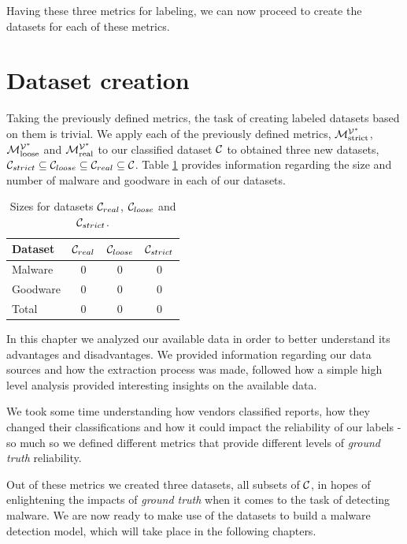 Having these three metrics for labeling, we can now proceed to create the datasets for each of these metrics.

\section{Dataset creation}
\label{section:dataset_creation}

Taking the previously defined metrics, the task of creating labeled datasets based on them is trivial.
We apply each of the previously defined metrics, $\mathcal{M}_{\mathrm{strict}}^{\mathcal{V}^*}$, $\mathcal{M}_{\mathrm{loose}}^{\mathcal{V}^*}$ and $\mathcal{M}_{\mathrm{real}}^{\mathcal{V}^*}$ to our classified dataset $\mathcal{C}$ to obtained three new datasets, $\mathcal{C}_{strict}\subseteq\mathcal{C}_{loose}\subseteq\mathcal{C}_{real}\subseteq\mathcal{C}$.
Table \ref{tab:dataset_sizes} provides information regarding the size and number of malware and goodware in each of our datasets.

\begin{table}[!htb]
	\renewcommand{\arraystretch}{1.2} %
	\centering
	\begin{tabular}{lccc}
		\toprule
		Dataset			& $\mathcal{C}_{real}$ & $\mathcal{C}_{loose}$ & $\mathcal{C}_{strict}$	\\
		\midrule
		Malware			& 0 & 0 & 0\\
		Goodware		& 0 & 0 & 0\\
		\midrule
		Total			& 0 & 0 & 0\\
		\bottomrule
	\end{tabular}
	\caption{Sizes for datasets $\mathcal{C}_{real}$, $\mathcal{C}_{loose}$ and $\mathcal{C}_{strict}$.}
	\label{tab:dataset_sizes}
\end{table}

\medskip

In this chapter we analyzed our available data in order to better understand its advantages and disadvantages.
We provided information regarding our data sources and how the extraction process was made, followed how a simple high level analysis provided interesting insights on the available data.

We took some time understanding how vendors classified reports, how they changed their classifications and how it could impact the reliability of our labels - so much so we defined different metrics that provide different levels of \textit{ground truth} reliability.

Out of these metrics we created three datasets, all subsets of $\mathcal{C}$, in hopes of enlightening the impacts of \textit{ground truth} when it comes to the task of detecting malware. We are now ready to make use of the datasets to build a malware detection model, which will take place in the following chapters.

